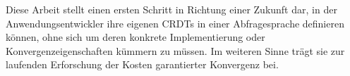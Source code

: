 Diese Arbeit stellt einen ersten Schritt in Richtung einer Zukunft dar,
in der Anwendungsentwickler ihre eigenen CRDTs in einer Abfragesprache
definieren können, ohne sich um deren konkrete Implementierung oder
Konvergenzeigenschaften kümmern zu müssen.
Im weiteren Sinne trägt sie zur laufenden Erforschung der Kosten garantierter
Konvergenz bei.
